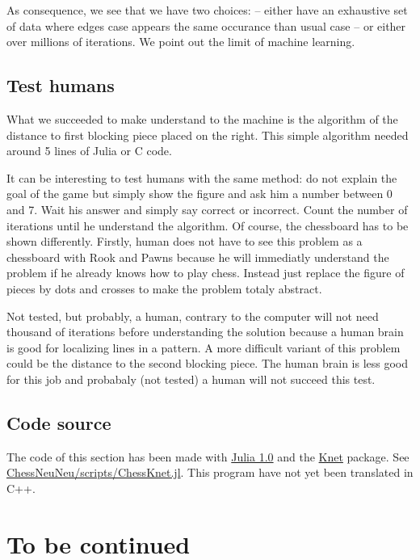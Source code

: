 \documentclass[a4paper,10pt]{article}
\begin{document}
As consequence, we see that we have two choices: -- either have an exhaustive
set of data where edges case appears the same occurance than usual case -- or
either over millions of iterations. We point out the limit of machine learning.

\subsection{Test humans}

What we succeeded to make understand to the machine is the algorithm of the
distance to first blocking piece placed on the right. This simple algorithm
needed around 5 lines of Julia or C code.

It can be interesting to test humans with the same method: do not explain the
goal of the game but simply show the figure and ask him a number between 0 and
7. Wait his answer and simply say correct or incorrect. Count the number of
iterations until he understand the algorithm. Of course, the chessboard has to
be shown differently. Firstly, human does not have to see this problem as a
chessboard with Rook and Pawns because he will immediatly understand the problem
if he already knows how to play chess. Instead just replace the figure of pieces
by dots and crosses to make the problem totaly abstract.

Not tested, but probably, a human, contrary to the computer will not need
thousand of iterations before understanding the solution because a human brain
is good for localizing lines in a pattern. A more difficult variant of this
problem could be the distance to the second blocking piece. The human brain is
less good for this job and probabaly (not tested) a human will not succeed this
test.

\subsection{Code source}

The code of this section has been made with
\href{https://github.com/JuliaLang/julia}{Julia 1.0} and the
\href{https://github.com/denizyuret/Knet.jl}{Knet} package. See
\href{https://github.com/Lecrapouille/ChessNeuNeu/blob/master/scripts/ChessKnet.jl}
{ChessNeuNeu/scripts/ChessKnet.jl}. This program have not yet been translated in
C++.

\section{To be continued}
\end{document}
